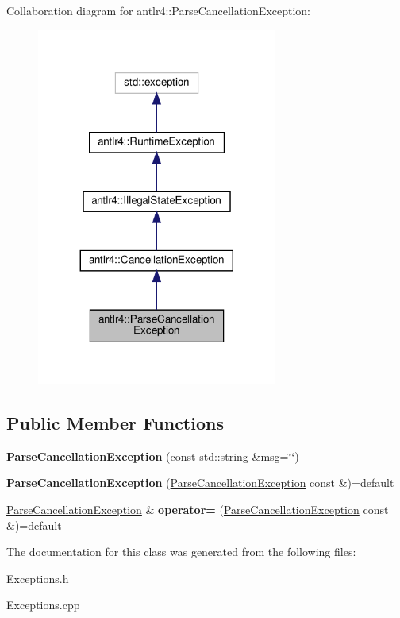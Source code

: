Collaboration diagram for antlr4\+:\+:Parse\+Cancellation\+Exception\+:
\nopagebreak
\begin{figure}[H]
\begin{center}
\leavevmode
\includegraphics[width=224pt]{classantlr4_1_1ParseCancellationException__coll__graph}
\end{center}
\end{figure}
\subsection*{Public Member Functions}
\begin{DoxyCompactItemize}
\item 
\mbox{\label{classantlr4_1_1ParseCancellationException_aafddbf578b81d2354c4ae9cb55b121b5}} 
{\bfseries Parse\+Cancellation\+Exception} (const std\+::string \&msg=\char`\"{}\char`\"{})
\item 
\mbox{\label{classantlr4_1_1ParseCancellationException_a2bcbdb458c5a2278fb894d38ff9ffe4f}} 
{\bfseries Parse\+Cancellation\+Exception} (\hyperlink{classantlr4_1_1ParseCancellationException}{Parse\+Cancellation\+Exception} const \&)=default
\item 
\mbox{\label{classantlr4_1_1ParseCancellationException_aa119a9d6f1ce9a9bd0ac61b56702e3f5}} 
\hyperlink{classantlr4_1_1ParseCancellationException}{Parse\+Cancellation\+Exception} \& {\bfseries operator=} (\hyperlink{classantlr4_1_1ParseCancellationException}{Parse\+Cancellation\+Exception} const \&)=default
\end{DoxyCompactItemize}


The documentation for this class was generated from the following files\+:\begin{DoxyCompactItemize}
\item 
Exceptions.\+h\item 
Exceptions.\+cpp\end{DoxyCompactItemize}
